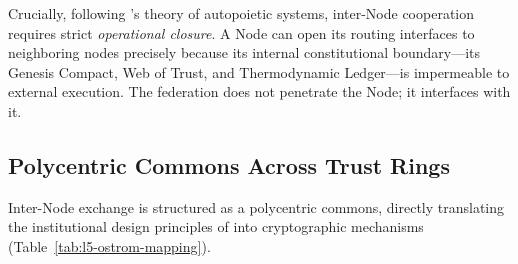Crucially, following \textcite{luhmann1995}'s theory of autopoietic systems, inter-Node cooperation requires strict \textit{operational closure}. A Node can open its routing interfaces to neighboring nodes precisely because its internal constitutional boundary—its Genesis Compact, Web of Trust, and Thermodynamic Ledger—is impermeable to external execution. The federation does not penetrate the Node; it interfaces with it.

\subsection{Polycentric Commons Across Trust Rings}

Inter-Node exchange is structured as a polycentric commons, directly translating the institutional design principles of \textcite{ostrom1990, ostrom2010} into cryptographic mechanisms (Table~\ref{tab:l5-ostrom-mapping}).

